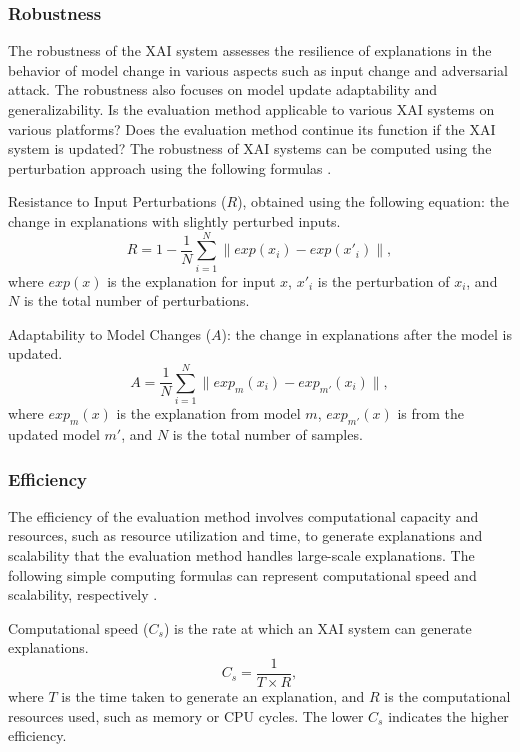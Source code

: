 \documentclass[final,5p,times,twocolumn]{elsarticle}
\begin{document}
\subsubsection{Robustness}
The robustness of the XAI system assesses the resilience of explanations in the behavior of model change in various aspects such as input change and adversarial attack. The robustness also focuses on model update adaptability and generalizability. Is the evaluation method applicable to various XAI systems on various platforms?  Does the evaluation method continue its function if the XAI system is updated? The robustness of XAI systems can be computed using the perturbation approach using the following formulas \cite{drenkow2021systematic}. 

Resistance to Input Perturbations ($R$), obtained using the following equation: the change in explanations with slightly perturbed inputs. 
\begin{equation}
 R = 1 - \frac{1}{N}\sum_{i=1}^{N} \| exp(x_i) - exp(x'_i) \|,
 \end{equation}
where $exp(x)$ is the explanation for input \( x \), \( x'_i \) is the perturbation of \( x_i \), and \( N \) is the total number of perturbations.

Adaptability to Model Changes ($A$): the change in explanations after the model is updated. 
\begin{equation}
 A = \frac{1}{N}\sum_{i=1}^{N} \| exp_m(x_i) - exp_{m'}(x_i) \|,
 \end{equation}
where $exp_m(x)$ is the explanation from model $m$, $exp_{m'}(x)$ is from the updated model $m'$, and $N$ is the total number of samples.

\subsubsection{Efficiency}
The efficiency of the evaluation method involves computational capacity and resources, such as resource utilization and time, to generate explanations and scalability that the evaluation method handles large-scale explanations. The following simple computing formulas can represent computational speed and scalability, respectively \cite{schryen2022speedup}.

Computational speed ($C_{s}$) is the rate at which an XAI system can generate explanations. 
\begin{equation}
C_s = \frac{1}{T \times R},
\end{equation}
where $T$ is the time taken to generate an explanation, and 
$R$ is the computational resources used, such as memory or CPU cycles. The lower $C_{s}$ indicates the higher efficiency.
\end{document}
